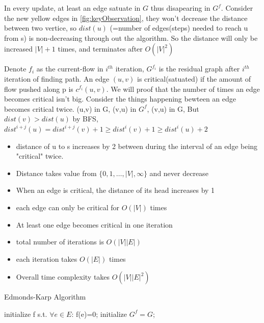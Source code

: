 In every update, at least an edge satuate in $G$ thus disapearing in $G^f$. Consider the new yellow edges in \ref{fig:keyObservation}, they won't decrease the distance between two vertice, so $dist(u)$ (=number of edges(steps) needed to reach u from s) is non-decreasing through out the algorithm. So the distance will only be increased $|V|+1$ times, and terminates after $O(|V|^2)$


Denote $f_i$ as the current-flow in $i^{th}$ iteration, $G^{f_i}$ is the residual graph after $i^{th}$ iteration of finding path. An edge $(u,v)$ is critical(satuated) if the amount of flow pushed along p is $c^{f_i}(u,v)$. We will proof that the number of times an edge becomes critical isn't big. Consider the things happening bewteen an edge becomes critical twice.
(u,v) in G, (v,u) in $G^f$, (v,u) in G,
But $dist(v)>dist(u)$ by BFS,
$dist^{i+j}(u)=dist^{i+j}(v)+1\geq dist^i(v)+1\geq dist^i(u)+2$

\begin{itemize}
\item distance of u to s increases by 2 between during the interval of an edge being "critical" twice.
\item Distance takes value from $\{0,1,\ldots,|V|,\infty\}$ and never decrease
\item When an edge is critical, the distance of its head increases by 1
\item each edge can only be critical for $O(|V|)$ times
\item At least one edge becomes critical in one iteration
\item total number of iterations is $O(|V||E|)$
\item each iteration takes $O(|E|)$ times
\item Overall time complexity takes $O(|V||E|^2)$
\end{itemize}


\begin{algorithm}
    \caption{Edmonds-Karp Algorithm}
    initialize f s.t. $\forall e \in E$: f(e)=0; initialize $G^f=G$;\\
\end{algorithm}

